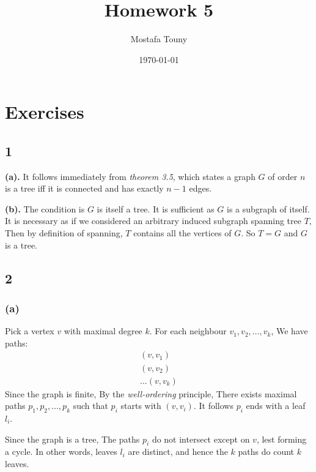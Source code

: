 \documentclass[12pt]{extarticle}
\title{Homework 5}
\author{Mostafa Touny}
\date{\today}
\begin{document}
\maketitle
\tableofcontents

\newpage


\section*{Exercises}



\subsection*{1}

\textbf{(a).} It follows immediately from \textit{theorem 3.5}, which states a graph $G$ of order $n$ is a tree iff it is connected and has exactly $n-1$ edges.

\textbf{(b).} The condition is $G$ is itself a tree. It is sufficient as $G$ is a subgraph of itself. It is necessary as if we considered an arbitrary induced subgraph spanning tree $T$, Then by definition of spanning, $T$ contains all the vertices of $G$. So $T = G$  and $G$ is a tree.



\subsection*{2}

\subsubsection*{(a)}

Pick a vertex $v$ with maximal degree $k$. For each neighbour $v_1, v_2, \dots, v_k$, We have paths:
\begin{align*}
    (v, v_1) \\
    (v, v_2) \\
    \dots
    (v, v_k)
\end{align*}
Since the graph is finite, By the \textit{well-ordering} principle, There exists maximal paths $p_1, p_2, \dots, p_k$ such that $p_i$ starts with $(v, v_i)$. It follows $p_i$ ends with a leaf $l_i$.

Since the graph is a tree, The paths $p_i$ do not intersect except on $v$, lest forming a cycle. In other words, leaves $l_i$ are distinct, and hence the $k$ paths do count $k$ leaves.
\end{document}
